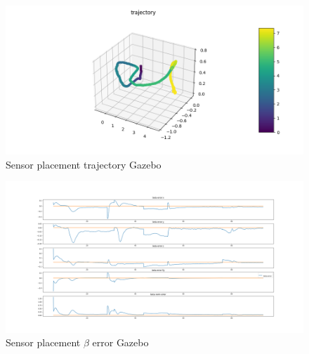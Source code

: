 \begin{figure}[h!]
   \centering
   \includegraphics[width=\linewidth]{Images/gazebo_trajectory_sensor.png}
   \caption{Sensor placement trajectory Gazebo}
   \label{fig:trajgazebosensor}
\end{figure}
\begin{figure}[h!]
   \centering
   \includegraphics[width=\linewidth]{Images/gazebo_betaerror_sensor.png}
   \caption{Sensor placement $\beta$ error Gazebo}
   \label{fig:betaerrorgazebosensor}
\end{figure}


 

